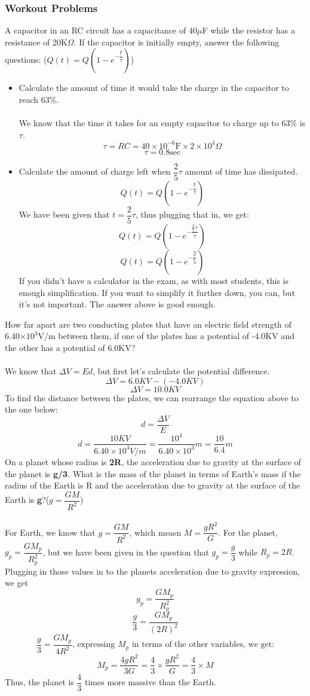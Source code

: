 \documentclass[11pt,addpoints]{exam}
\begin{document}
{{{\begin{questions}
					\subsubsection*{Workout Problems}
					\question A capacitor in an RC circuit has a capacitance of 40$\mu$F while the resistor has a resistance of 20K$\Omega$. If the capacitor is initially empty, answer the following questions: ($Q(t)=Q(1-e^{-\dfrac{t}{\tau}})$)
					\begin{itemize}
						\item Calculate the amount of time it would take the charge in the capacitor to reach 63\%. \\ \\
						We know that the time it takes for an empty capacitor to charge up to 63\% is $\tau$.
						$$\tau=RC=40\times10^{-6}\text{F}\times2\times10^4\Omega$$
						$$\tau=0.8\text{sec}$$
						\item Calculate the amount of charge left when $\dfrac{2}{5}\tau$ amount of time has dissipated.
						$$Q(t)=Q(1-e^{-\dfrac{t}{\tau}})$$
						We have been given that $t=\dfrac{2}{5}\tau$, thus plugging that in, we get:
						$$Q(t)=Q(1-e^{-\dfrac{\frac{2}{5}\tau}{\tau}})$$
						$$Q(t)=Q(1-e^{-\dfrac{2}{5}})$$
						If you didn't have a calculator in the exam, as with most students, this is enough simplification. If you want to simplify it further down, you can, but it's not important. The answer above is good enough.
					\end{itemize}
					\question How far apart are two conducting plates that have an electric field strength of  6.40×$10^3$V/m  between them, if one of the plates has a potential of -4.0KV and the other has a potential of 6.0KV? \\ \\
					We know that $\Delta V=Ed$, but first let's calculate the potential difference.
					$$\Delta V=6.0KV-(-4.0KV)$$
					$$\Delta V=10.0KV$$	
					To find the distance between the plates, we can rearrange the equation above to the one below:
					$$d=\dfrac{\Delta V}{E}$$
					$$d=\dfrac{10KV}{6.40\times10^3 V/m}=\dfrac{10^4}{6.40\times10^3}m=\dfrac{10}{6.4}m$$
					\question On a planet whose radius is  \textbf{2R}, the acceleration due to gravity at the surface of the planet is \textbf{g/3}. What is the mass of the planet in terms of Earth's mass if the radius of the Earth is R and the acceleration due to gravity at the surface of the Earth is \textbf{g}?($g=\dfrac{GM}{R^2}$) \\ \\
					For Earth, we know that $g=\dfrac{GM}{R^2}$, which measn $M=\dfrac{gR^2}{G}$. For the planet, $g_p=\dfrac{GM_p}{R_p^2}$, but we have been given in the question that $g_p=\dfrac{g}{3}$ while $R_p=2R$. Plugging in those values in to the planets acceleration due to gravity expression, we get 
					$$g_p=\dfrac{GM_p}{R_p^2}$$
					$$\dfrac{g}{3}=\dfrac{GM_p}{(2R)^2}$$ 
					$$\dfrac{g}{3}=\dfrac{GM_p}{4R^2}\text{, expressing }M_p\text{ in terms of the other variables, we get:} $$
					$$M_p=\dfrac{4gR^2}{3G}=\dfrac{4}{3}\times\dfrac{gR^2}{G}=\dfrac{4}{3}\times M$$
					Thus, the planet is $\dfrac{4}{3}$ times more massive than the Earth.

\end{questions}}}}
\end{document}
